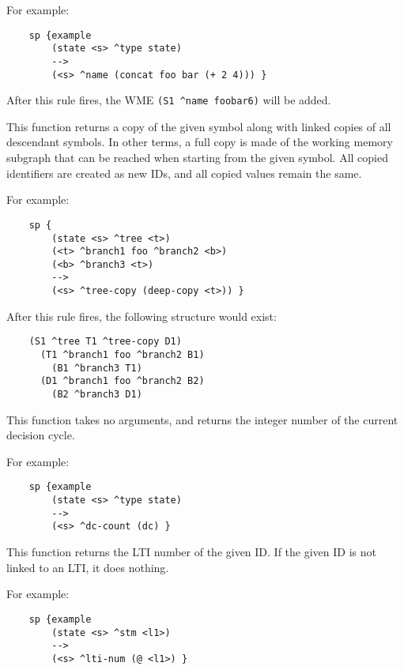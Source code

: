 \begin{description}
	For example:
	
	\begin{verbatim}
	sp {example
	    (state <s> ^type state)
	    -->
	    (<s> ^name (concat foo bar (+ 2 4))) }
	\end{verbatim}

	After this rule fires, the WME \verb=(S1 ^name foobar6)= will be added.


\item [\soarb{deep-copy} --- ] 
	This function returns a copy of the given symbol along with linked copies of all descendant symbols. In other terms, a full copy is made of the working memory subgraph that can be reached when starting from the given symbol. All copied identifiers are created as new IDs, and all copied values remain the same.

	For example:
	
	\begin{verbatim}
	sp {
	    (state <s> ^tree <t>)
	    (<t> ^branch1 foo ^branch2 <b>)
	    (<b> ^branch3 <t>)
	    -->
	    (<s> ^tree-copy (deep-copy <t>)) }
	\end{verbatim}
	
	After this rule fires, the following structure would exist:
	
	\begin{verbatim}
	(S1 ^tree T1 ^tree-copy D1)
	  (T1 ^branch1 foo ^branch2 B1)
	    (B1 ^branch3 T1)
	  (D1 ^branch1 foo ^branch2 B2)
	    (B2 ^branch3 D1)
	\end{verbatim}


\item [\soarb{dc} --- ] 
	This function takes no arguments, and returns the integer number of the current decision cycle. 

	For example:
	
	\begin{verbatim}
	sp {example
	    (state <s> ^type state)
	    -->
	    (<s> ^dc-count (dc) }
	\end{verbatim}


\item [\soarb{@ (get)} --- ] 
	This function returns the LTI number of the given ID. If the given ID is not linked to an LTI, it does nothing.
	
	For example:
	
	\begin{verbatim}
	sp {example
	    (state <s> ^stm <l1>)
	    -->
	    (<s> ^lti-num (@ <l1>) }
	\end{verbatim}
	

\end{description}
